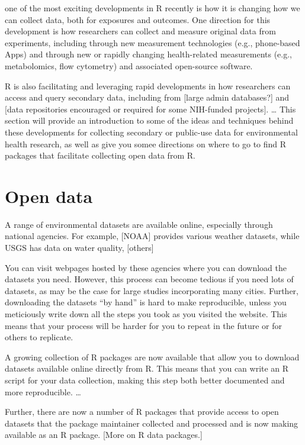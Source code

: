 \documentclass[]{tufte-book}
\begin{document}
 one of the most exciting
developments in R recently is how it is changing how we can collect data, both for
exposures and outcomes. One direction for this development is how researchers can
collect and measure original data from experiments, including through new measurement
technologies (e.g., phone-based Apps) and through new or rapidly changing health-related
measurements (e.g., metabolomics, flow cytometry) and associated open-source
software.

R is also facilitating and leveraging rapid developments in how researchers can access and
query secondary data, including from {[}large admin databases?{]} and {[}data repositories
encouraged or required for some NIH-funded projects{]}. \ldots{} This section will provide an
introduction to some of the ideas and techniques behind these developments for
collecting secondary or public-use data for environmental health research, as well as
give you somee directions on where to go to find R packages that facilitate collecting
open data from R.

\hypertarget{open-data}{%
\section{Open data}\label{open-data}}

A range of environmental datasets are available online, especially through national agencies.
For example, {[}NOAA{]} provides various weather datasets, while USGS has data on water quality,
{[}others{]}

You can visit webpages hosted by these agencies where you can download the datasets you need.
However, this process can become tedious if you need lots of datasets, as may be the case for
large studies incorporating many cities. Further, downloading the datasets ``by hand'' is hard
to make reproducible, unless you meticiously write down all the steps you took as you visited
the website. This means that your process will be harder for you to repeat in the future
or for others to replicate.

A growing collection of R packages are now available that allow you to download datasets
available online directly from R. This means that you can write an R script for your data
collection, making this step both better documented and more reproducible. \ldots{}

Further, there are now a number of R packages that provide access to open datasets that the
package maintainer collected and processed and is now making available as an R package.
{[}More on R data packages.{]}
\end{document}
